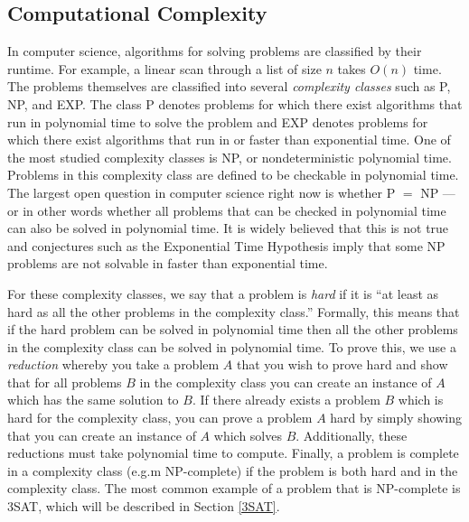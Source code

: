 \documentclass[11pt,letterpaper]{article}
\begin{document}
\subsection{Computational Complexity}
In computer science, algorithms for solving problems are classified by their runtime. For example, a linear scan through a list of size $n$ takes $O(n)$ time. The problems themselves are classified into several \emph{complexity classes} such as P, NP, and EXP. The class P denotes problems for which there exist algorithms that run in polynomial time to solve the problem and EXP denotes problems for which there exist algorithms that run in or faster than exponential time. One of the most studied complexity classes is NP, or nondeterministic polynomial time. Problems in this complexity class are defined to be checkable in polynomial time. The largest open question in computer science right now is whether P $=$ NP --- or in other words whether all problems that can be checked in polynomial time can also be solved in polynomial time. It is widely believed that this is not true and conjectures such as the Exponential Time Hypothesis imply that some NP problems are not solvable in faster than exponential time.

For these complexity classes, we say that a problem is \emph{hard} if it is ``at least as hard as all the other problems in the complexity class.'' Formally, this means that if the hard problem can be solved in polynomial time then all the other problems in the complexity class can be solved in polynomial time. To prove this, we use a \emph{reduction} whereby you take a problem $A$ that you wish to prove hard and show that for all problems $B$ in the complexity class you can create an instance of $A$ which has the same solution to $B$. If there already exists a problem $B$ which is hard for the complexity class, you can prove a problem $A$ hard by simply showing that you can create an instance of $A$ which solves $B$. Additionally, these reductions must take polynomial time to compute. Finally, a problem is complete in a complexity class (e.g.m NP-complete) if the problem is both hard and in the complexity class. The most common example of a problem that is NP-complete is 3SAT, which will be described in Section \ref{3SAT}.
\end{document}
